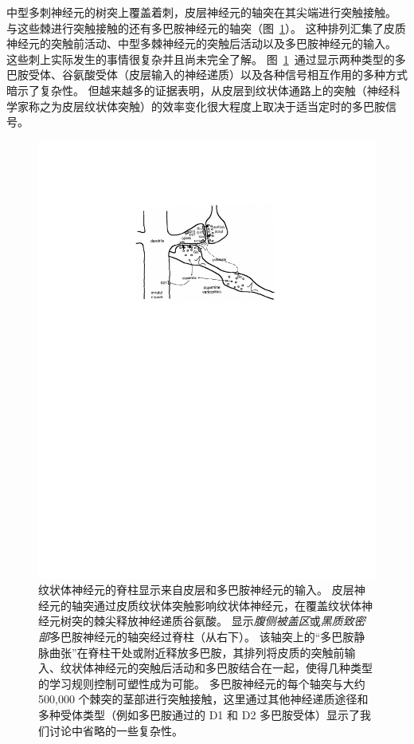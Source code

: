中型多刺神经元的树突上覆盖着刺，皮层神经元的轴突在其尖端进行突触接触。
与这些棘进行突触接触的还有多巴胺神经元的轴突（图~\ref{fig:12_2}）。
这种排列汇集了皮质神经元的突触前活动、中型多棘神经元的突触后活动以及多巴胺神经元的输入。
这些刺上实际发生的事情很复杂并且尚未完全了解。
图~\ref{fig:12_2}~通过显示两种类型的多巴胺受体、谷氨酸受体（皮层输入的神经递质）以及各种信号相互作用的多种方式暗示了复杂性。
但越来越多的证据表明，从皮层到纹状体通路上的突触（神经科学家称之为皮层纹状体突触）的效率变化很大程度上取决于适当定时的多巴胺信号。



\begin{figure}[!htb]
	\centering
	\includegraphics[width=0.7\linewidth]{chap12/fig_12_2}
	\caption{纹状体神经元的脊柱显示来自皮层和多巴胺神经元的输入。
		皮层神经元的轴突通过皮质纹状体突触影响纹状体神经元，在覆盖纹状体神经元树突的棘尖释放神经递质谷氨酸。
		显示\textit{腹侧被盖区}或\textit{黑质致密部}多巴胺神经元的轴突经过脊柱（从右下）。
		该轴突上的“多巴胺静脉曲张”在脊柱干处或附近释放多巴胺，其排列将皮质的突触前输入、纹状体神经元的突触后活动和多巴胺结合在一起，使得几种类型的学习规则控制可塑性成为可能。
		多巴胺神经元的每个轴突与大约 500,000 个棘突的茎部进行突触接触，这里通过其他神经递质途径和多种受体类型（例如多巴胺通过的 D1 和 D2 多巴胺受体）显示了我们讨论中省略的一些复杂性\cite{schultz1998predictive}。
		\label{fig:12_2}}
\end{figure}



